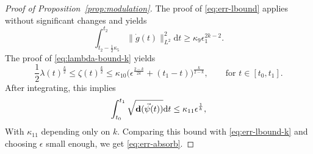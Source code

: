 \documentclass[10pt,reqno]{amsart}
\numberwithin{equation}{section}
\theoremstyle{remark}
\newcommand{\ud}{\mathrm{d}}
\newcommand{\0}{\emptyset}
\newcommand{\eps}{\epsilon}
\newcommand{\bfd}{{\bf d}}
\begin{document}
\begin{proof}[Proof of Proposition~\ref{prop:modulation}]
The proof of \eqref{eq:err-lbound} applies without significant changes and yields
\begin{equation}
\label{eq:err-lbound-k}
\int_{t_2 - \frac 12 \kappa_5}^{t_2} \|\dot g(t)\|_{L^2}^2 \ud t \geq \kappa_9 \eps_1^{2k-2}.
\end{equation}
The proof of \eqref{eq:lambda-bound-k} yields
\begin{equation}
\frac{1}{2} \lambda(t)^\frac k2 \le \zeta(t)^{\frac{k}{2}} \leq \kappa_{10}\big(\eps^\frac{2-k}{2k} + (t_1 - t)\big)^\frac{k}{2-k}, \qquad \text{for }t \in [t_0, t_1].
\end{equation}
After integrating, this implies
\begin{equation}
\label{eq:err-bound-k}
\int_{t_0}^{t_1}\sqrt{\bfd(\vec \psi(t))}\ud t \leq \kappa_{11}\eps^\frac 1k,
\end{equation}
With $\kappa_{11}$ depending only on $k$.
Comparing this bound with \eqref{eq:err-lbound-k} and choosing $\eps$ small enough,
we get \eqref{eq:err-absorb}.
\end{proof}
\end{document}
